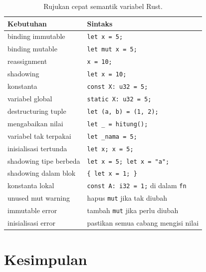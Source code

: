 \documentclass[11pt,a4paper]{article}
\begin{document}
\begin{table}[H]
	\centering
	\caption{Rujukan cepat semantik variabel Rust.}
	\label{tab:cheat}
	\scriptsize
	\setlength{\tabcolsep}{4pt}
	\renewcommand{\arraystretch}{1.15}
	\begin{tabularx}{\textwidth}{>{\raggedright\arraybackslash}X >{\raggedright\arraybackslash}X}
		\toprule
		Kebutuhan              & Sintaks                                         \\
		\midrule
		binding immutable      & \texttt{let x = 5;}                             \\
		binding mutable        & \texttt{let mut x = 5;}                         \\
		reassignment           & \texttt{x = 10;}                                \\
		shadowing              & \texttt{let x = 10;}                            \\
		konstanta              & \texttt{const X: u32 = 5;}                      \\
		variabel global        & \texttt{static X: u32 = 5;}                     \\
		destructuring tuple    & \texttt{let (a, b) = (1, 2);}                   \\
		mengabaikan nilai      & \texttt{let \_ = hitung();}                     \\
		variabel tak terpakai  & \texttt{let \_nama = 5;}                        \\
		inisialisasi tertunda  & \texttt{let x; x = 5;}                          \\
		shadowing tipe berbeda & \texttt{let x = 5; let x = "a";}                \\
		shadowing dalam blok   & \texttt{\{ let x = 1; \}}                       \\
		konstanta lokal        & \texttt{const A: i32 = 1;} di dalam \texttt{fn} \\
		unused mut warning     & hapus \texttt{mut} jika tak diubah              \\
		immutable error        & tambah \texttt{mut} jika perlu diubah           \\
		inisialisasi error     & pastikan semua cabang mengisi nilai             \\
		\bottomrule
	\end{tabularx}
\end{table}

\section{Kesimpulan}
\end{document}
